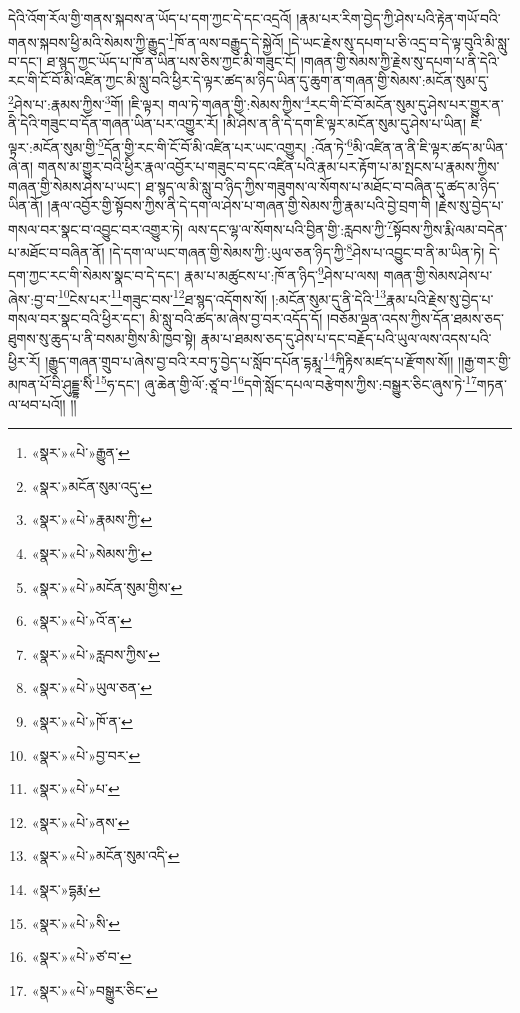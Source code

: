 དེའི་འོག་རོལ་གྱི་གནས་སྐབས་ན་ཡོད་པ་དག་ཀྱང་དེ་དང་འདྲའོ། །རྣམ་པར་རིག་བྱེད་ཀྱི་ཤེས་པའི་རྟེན་གཡོ་བའི་གནས་སྐབས་ཕྱི་མའི་སེམས་ཀྱི་རྒྱུད་\footnote{«སྣར་»«པེ་»རྒྱུན་}ཁོ་ན་ལས་བརྒྱུད་དེ་སྐྱེའོ། །དེ་ཡང་རྗེས་སུ་དཔག་པ་ཅི་འདྲ་བ་དེ་ལྟ་བུའི་མི་སླུ་བ་དང་། ཐ་སྙད་ཀྱང་ཡོད་པ་ཁོ་ན་ཡིན་པས་ཅིས་ཀྱང་མི་གཟུང་ངོ། །གཞན་གྱི་སེམས་ཀྱི་རྗེས་སུ་དཔག་པ་ནི་དེའི་རང་གི་ངོ་བོ་མི་འཛིན་ཀྱང་མི་སླུ་བའི་ཕྱིར་དེ་ལྟར་ཚད་མ་ཉིད་ཡིན་དུ་ཆུག་ན་གཞན་གྱི་སེམས་:མངོན་སུམ་དུ་\footnote{«སྣར་»མངོན་སུམ་འདུ་}ཤེས་པ་:རྣམས་ཀྱིས་\footnote{«སྣར་»«པེ་»རྣམས་ཀྱི་}གོ། །ཇི་ལྟར། གལ་ཏེ་གཞན་གྱི་:སེམས་ཀྱིས་\footnote{«སྣར་»«པེ་»སེམས་ཀྱི་}རང་གི་ངོ་བོ་མངོན་སུམ་དུ་ཤེས་པར་གྱུར་ན་ནི་དེའི་གཟུང་བ་དོན་གཞན་ཡིན་པར་འགྱུར་རོ། །མི་ཤེས་ན་ནི་དེ་དག་ཇི་ལྟར་མངོན་སུམ་དུ་ཤེས་པ་ཡིན། ཇི་ལྟར་:མངོན་སུམ་གྱི་\footnote{«སྣར་»«པེ་»མངོན་སུམ་གྱིས་}དོན་གྱི་རང་གི་ངོ་བོ་མི་འཛིན་པར་ཡང་འགྱུར། :འོན་ཏེ་\footnote{«སྣར་»«པེ་»འོ་ན་}མི་འཛིན་ན་ནི་ཇི་ལྟར་ཚད་མ་ཡིན་ཞེ་ན། གནས་མ་གྱུར་བའི་ཕྱིར་རྣལ་འབྱོར་པ་གཟུང་བ་དང་འཛིན་པའི་རྣམ་པར་རྟོག་པ་མ་སྤངས་པ་རྣམས་ཀྱིས་གཞན་གྱི་སེམས་ཤེས་པ་ཡང་། ཐ་སྙད་ལ་མི་སླུ་བ་ཉིད་ཀྱིས་གཟུགས་ལ་སོགས་པ་མཐོང་བ་བཞིན་དུ་ཚད་མ་ཉིད་ཡིན་ནོ། །རྣལ་འབྱོར་གྱི་སྟོབས་ཀྱིས་ནི་དེ་དག་ལ་ཤེས་པ་གཞན་གྱི་སེམས་ཀྱི་རྣམ་པའི་བྱེ་བྲག་གི །རྗེས་སུ་བྱེད་པ་གསལ་བར་སྣང་བ་འབྱུང་བར་འགྱུར་ཏེ། ལས་དང་ལྷ་ལ་སོགས་པའི་བྱིན་གྱི་:རླབས་ཀྱི་\footnote{«སྣར་»«པེ་»རླབས་ཀྱིས་}སྟོབས་ཀྱིས་རྨི་ལམ་བདེན་པ་མཐོང་བ་བཞིན་ནོ། །དེ་དག་ལ་ཡང་གཞན་གྱི་སེམས་ཀྱི་:ཡུལ་ཅན་ཉིད་ཀྱི་\footnote{«སྣར་»«པེ་»ཡུལ་ཅན་}ཤེས་པ་འབྱུང་བ་ནི་མ་ཡིན་ཏེ། དེ་དག་ཀྱང་རང་གི་སེམས་སྣང་བ་དེ་དང་། རྣམ་པ་མཚུངས་པ་:ཁོ་ན་ཉིད་\footnote{«སྣར་»«པེ་»ཁོ་ན་}ཤེས་པ་ལས། གཞན་གྱི་སེམས་ཤེས་པ་ཞེས་:བྱ་བ་\footnote{«སྣར་»«པེ་»བྱ་བར་}ངེས་པར་\footnote{«སྣར་»«པེ་»པ་}གཟུང་བས་\footnote{«སྣར་»«པེ་»ནས་}ཐ་སྙད་འདོགས་སོ། །:མངོན་སུམ་དུ་ནི་དེའི་\footnote{«སྣར་»«པེ་»མངོན་སུམ་འདི་}རྣམ་པའི་རྗེས་སུ་བྱེད་པ་གསལ་བར་སྣང་བའི་ཕྱིར་དང་། མི་སླུ་བའི་ཚད་མ་ཞེས་བྱ་བར་འདོད་དོ། །བཅོམ་ལྡན་འདས་ཀྱིས་དོན་ཐམས་ཅད་ཐུགས་སུ་ཆུད་པ་ནི་བསམ་གྱིས་མི་ཁྱབ་སྟེ། རྣམ་པ་ཐམས་ཅད་དུ་ཤེས་པ་དང་བརྗོད་པའི་ཡུལ་ལས་འདས་པའི་ཕྱིར་རོ། །རྒྱུད་གཞན་གྲུབ་པ་ཞེས་བྱ་བའི་རབ་ཏུ་བྱེད་པ་སློབ་དཔོན་དྷརྨཱ་\footnote{«སྣར་»དྷརྨ་}ཀཱིརྟིས་མཛད་པ་རྫོགས་སོ།། །།རྒྱ་གར་གྱི་མཁན་པོ་བི་ཤུདྡྷ་སིཾ་\footnote{«སྣར་»«པེ་»སི་}ཧ་དང་། ཞུ་ཆེན་གྱི་ལོ་:ཙཱ་བ་\footnote{«སྣར་»«པེ་»ཙ་བ་}དགེ་སློང་དཔལ་བརྩེགས་ཀྱིས་:བསྒྱུར་ཅིང་ཞུས་ཏེ་\footnote{«སྣར་»«པེ་»བསྒྱུར་ཅིང་}གཏན་ལ་ཕབ་པའོ།། །།